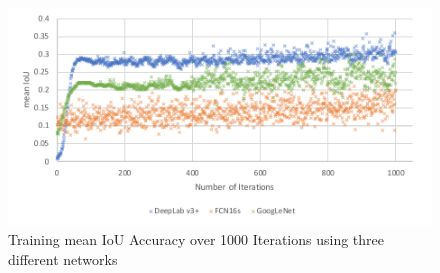 \begin{figure}
	\centering
	\includegraphics{figures/experiments/network-comparison.pdf}
		\caption[Network Comparison Chart]{Training mean IoU Accuracy over 1000 Iterations using three different networks}
		\label{chart:experiments-networkcomparison}
\end{figure}